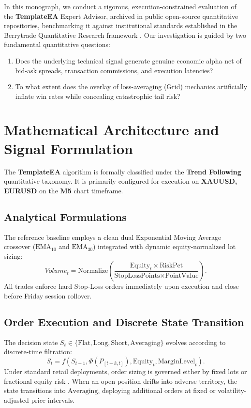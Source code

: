 \documentclass[11pt,a4paper]{article}
\begin{document}
In this monograph, we conduct a rigorous, execution-constrained evaluation of the \textbf{TemplateEA} Expert Advisor, archived in public open-source quantitative repositories, benchmarking it against institutional standards established in the Berrytrade Quantitative Research framework \cite{artsu2026illusion}. Our investigation is guided by two fundamental quantitative questions:
\begin{enumerate}
    \item Does the underlying technical signal generate genuine economic alpha net of bid-ask spreads, transaction commissions, and execution latencies?
    \item To what extent does the overlay of loss-averaging (Grid) mechanics artificially inflate win rates while concealing catastrophic tail risk?
\end{enumerate}

\section{Mathematical Architecture and Signal Formulation}
The \textbf{TemplateEA} algorithm is formally classified under the \textbf{Trend Following} quantitative taxonomy. It is primarily configured for execution on \textbf{XAUUSD, EURUSD} on the \textbf{M5} chart timeframe.

\subsection{Analytical Formulations}

The reference baseline employs a clean dual Exponential Moving Average crossover ($\text{EMA}_{10}$ and $\text{EMA}_{30}$) integrated with dynamic equity-normalized lot sizing:
\begin{equation}
Volume_t = \text{Normalize}\left(\frac{\text{Equity}_t \times \text{RiskPct}}{\text{StopLossPoints} \times \text{PointValue}}\right).
\end{equation}
All trades enforce hard Stop-Loss orders immediately upon execution and close before Friday session rollover.


\subsection{Order Execution and Discrete State Transition}
The decision state $S_t \in \{\text{Flat}, \text{Long}, \text{Short}, \text{Averaging}\}$ evolves according to discrete-time filtration:
\begin{equation}
S_{t} = f(S_{t-1}, \Phi(P_{[t-k, t]}), \text{Equity}_t, \text{MarginLevel}_t).
\end{equation}
Under standard retail deployments, order sizing is governed either by fixed lots or fractional equity risk \cite{lopez2018advances, carhart1997persistence}. When an open position drifts into adverse territory, the state transitions into $\text{Averaging}$, deploying additional orders at fixed or volatility-adjusted price intervals.
\end{document}
